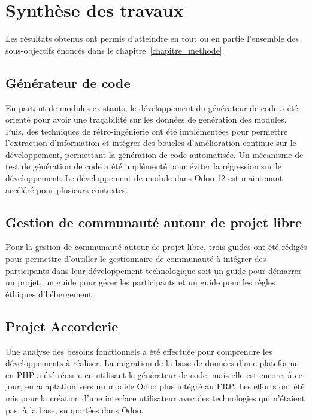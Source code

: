 \label{sec:Conclusion}

\section{Synthèse des travaux}
Les résultats obtenus ont permis d’atteindre en tout ou en partie l’ensemble des sous-objectifs énoncés dans le chapitre~\ref{chapitre_methode}.%


\subsection{Générateur de code}

En partant de modules existants, le développement du générateur de code a été orienté pour avoir une traçabilité sur les données de génération des modules. Puis, des techniques de rétro-ingénierie ont été implémentées pour permettre l'extraction d'information et intégrer des boucles d'amélioration continue sur le développement, permettant la génération de code automatisée. Un mécanisme de test de génération de code a été implémenté pour éviter la régression sur le développement. Le développement de module dans Odoo 12 est maintenant accéléré pour plusieurs contextes.

\subsection{Gestion de communauté autour de projet libre}
Pour la gestion de communauté autour de projet libre, trois guides ont été rédigés pour permettre d'outiller le gestionnaire de communauté à intégrer des participants dans leur développement technologique soit un guide pour démarrer un projet, un guide pour gérer les participants et un guide pour les règles éthiques d'hébergement.

\subsection{Projet Accorderie}

Une analyse des besoins fonctionnels a été effectuée pour comprendre les développements à réaliser. La migration de la base de données d'une plateforme en PHP a été réussie en utilisant le générateur de code, mais elle est encore, à ce jour, en adaptation vers un modèle Odoo plus intégré au ERP. Les efforts ont été mis pour la création d’une interface utilisateur avec des technologies qui n’étaient pas, à la base, supportées dans Odoo.

